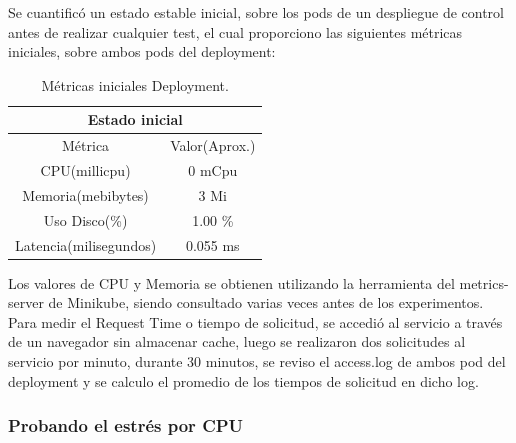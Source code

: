 

\par Se cuantific\'o un estado estable inicial, sobre los pods de un despliegue de control antes de realizar cualquier test, el cual proporciono las siguientes métricas iniciales, sobre ambos pods del deployment:
\begin{table}[ht!]
\begin{center}
\begin{tabular}{ |c|c| } 
 \hline
 \multicolumn{2}{|c|}{Estado inicial} \\
 \hline
 \hline
 Métrica & Valor(Aprox.)\\
 \hline
 CPU(millicpu) & 0 mCpu\\
 Memoria(mebibytes) & 3 Mi \\
 Uso Disco(\%) & 1.00 \% \\
 Latencia(milisegundos) & 0.055 ms\\
 \hline
\end{tabular}
\end{center}
\caption{Métricas iniciales Deployment.}
\label{tab:tabla40}
\end{table}

\par Los valores de CPU y Memoria se obtienen utilizando la herramienta del metrics-server de Minikube, siendo consultado varias veces antes de los experimentos. Para medir el Request Time o tiempo de solicitud, se accedió al servicio a través de un navegador sin almacenar cache, luego se realizaron dos solicitudes al servicio por minuto, durante 30 minutos, se reviso el access.log de ambos pod del deployment y se calculo el promedio de los tiempos de solicitud en dicho log.


\subsubsection{Probando el estrés por CPU}


